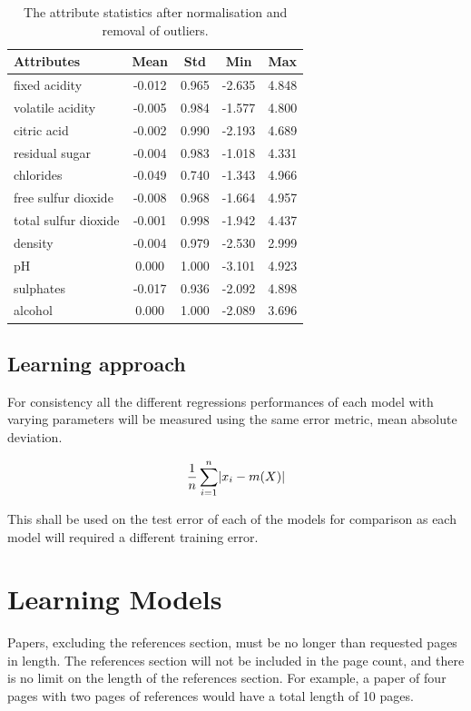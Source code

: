 \documentclass[10pt,twocolumn,letterpaper]{article}
\DeclarePairedDelimiter\abs{\lvert}{\rvert}%
\begin{document}
\begin{table}[h]
	\begin{center}
		\begin{tabular}{|l|c|c|c|c|}
			\hline
			Attributes & Mean & Std & Min & Max \\
			\hline
			fixed acidity & -0.012 & 0.965 & -2.635 & 4.848 \\
			volatile acidity & -0.005 & 0.984 & -1.577 & 4.800 \\
			citric acid & -0.002 & 0.990 & -2.193 & 4.689 \\
			residual sugar & -0.004 & 0.983 & -1.018 & 4.331 \\
			chlorides & -0.049 & 0.740 & -1.343 & 4.966 \\
			free sulfur dioxide & -0.008 & 0.968 & -1.664 & 4.957 \\
			total sulfur dioxide & -0.001 & 0.998 & -1.942 & 4.437 \\
			density & -0.004 & 0.979 & -2.530 & 2.999 \\
			pH & 0.000 & 1.000 & -3.101 & 4.923 \\
			sulphates & -0.017 & 0.936 & -2.092 & 4.898 \\
			alcohol & 0.000 & 1.000 & -2.089 & 3.696 \\ 
			\hline
		\end{tabular}
	\end{center}
	\caption{The attribute statistics after normalisation and removal of outliers.}
\end{table}

\subsection{Learning approach}

For consistency all the different regressions performances of each model with varying parameters will be measured using the same error metric, mean absolute deviation. 

\begin{equation}
\frac{1}{n} \sum_{i = 1}^{n} \abs{x_i - m(X)}
\end{equation}

This shall be used on the test error of each of the models for comparison as each model will required a different training error.

\section{Learning Models}
Papers, excluding the references section,
must be no longer than requested pages in length. The references section
will not be included in the page count, and there is no limit on the
length of the references section. For example, a paper of four pages
with two pages of references would have a total length of 10 pages.
\end{document}
